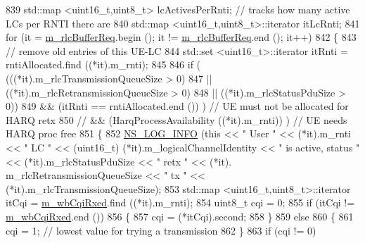 \begin{DoxyCode}
{839         std::map <uint16\_t,uint8\_t> lcActivesPerRnti; \textcolor{comment}{// tracks how many active LCs per RNTI there are}
840         std::map <uint16\_t,uint8\_t>::iterator itLcRnti;
841         \textcolor{keywordflow}{for} (it = \hyperlink{classns3_1_1MmWaveRrMacScheduler_a4808ca626b0b12682c3f1a079d016997}{m\_rlcBufferReq}.begin (); it != \hyperlink{classns3_1_1MmWaveRrMacScheduler_a4808ca626b0b12682c3f1a079d016997}{m\_rlcBufferReq}.end (); it++)
842         \{
843                 \textcolor{comment}{// remove old entries of this UE-LC}
844                 std::set <uint16\_t>::iterator itRnti = rntiAllocated.find ((*it).m\_rnti);
845 
846                 \textcolor{keywordflow}{if} ( (((*it).m\_rlcTransmissionQueueSize > 0)
847                                 || ((*it).m\_rlcRetransmissionQueueSize > 0)
848                                 || ((*it).m\_rlcStatusPduSize > 0))
849                                 && (itRnti == rntiAllocated.end ()) )  \textcolor{comment}{// UE must not be allocated for HARQ
       retx}
850                         \textcolor{comment}{//                                                                              &&
       (HarqProcessAvailability ((*it).m\_rnti))  ) // UE needs HARQ proc free}
851                 \{
852                         \hyperlink{group__logging_gafbd73ee2cf9f26b319f49086d8e860fb}{NS\_LOG\_INFO} (\textcolor{keyword}{this} << \textcolor{stringliteral}{" User "} << (*it).m\_rnti << \textcolor{stringliteral}{" LC "} << (uint16\_t)
      (*it).m\_logicalChannelIdentity << \textcolor{stringliteral}{" is active, status  "} << (*it).m\_rlcStatusPduSize << \textcolor{stringliteral}{" retx "} << (*it).
      m\_rlcRetransmissionQueueSize << \textcolor{stringliteral}{" tx "} << (*it).m\_rlcTransmissionQueueSize);
853                         std::map <uint16\_t,uint8\_t>::iterator itCqi = 
      \hyperlink{classns3_1_1MmWaveRrMacScheduler_ab048c846f6d5d71795b65b9f91c6766a}{m\_wbCqiRxed}.find ((*it).m\_rnti);
854                         uint8\_t cqi = 0;
855                         \textcolor{keywordflow}{if} (itCqi != \hyperlink{classns3_1_1MmWaveRrMacScheduler_ab048c846f6d5d71795b65b9f91c6766a}{m\_wbCqiRxed}.end ())
856                         \{
857                                 cqi = (*itCqi).second;
858                         \}
859                         \textcolor{keywordflow}{else}
860                         \{
861                                 cqi = 1; \textcolor{comment}{// lowest value for trying a transmission}
862                         \}
863                         \textcolor{keywordflow}{if} (cqi != 0)
}
\end{DoxyCode}
